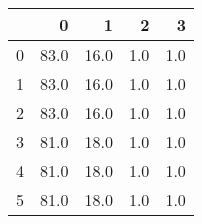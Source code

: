 \begin{tabular}{lrrrr}
\toprule
{} &     0 &     1 &    2 &    3 \\
\midrule
0 &  83.0 &  16.0 &  1.0 &  1.0 \\
1 &  83.0 &  16.0 &  1.0 &  1.0 \\
2 &  83.0 &  16.0 &  1.0 &  1.0 \\
3 &  81.0 &  18.0 &  1.0 &  1.0 \\
4 &  81.0 &  18.0 &  1.0 &  1.0 \\
5 &  81.0 &  18.0 &  1.0 &  1.0 \\
\bottomrule
\end{tabular}
